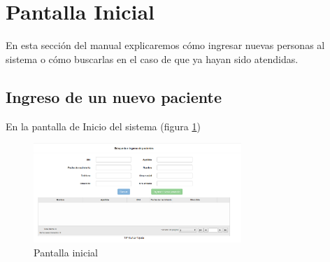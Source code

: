 \section{Pantalla Inicial}
En esta sección del manual explicaremos cómo ingresar nuevas personas al sistema o cómo buscarlas en el caso de que ya hayan sido atendidas.

\subsection{Ingreso de un nuevo paciente}
En la pantalla de Inicio del sistema (figura \ref{fig:inicio})

\begin{figure}
\centerline{\includegraphics[width=0.7\textwidth]{inicio.png}}
\caption{Pantalla inicial} \label{fig:inicio}
\end{figure}